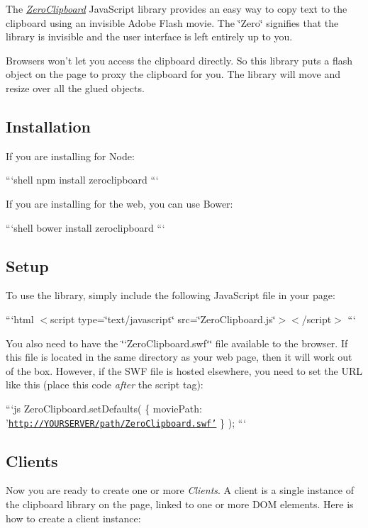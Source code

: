 The {\itshape \hyperlink{class_zero_clipboard}{Zero\-Clipboard}} Java\-Script library provides an easy way to copy text to the clipboard using an invisible Adobe Flash movie. The \char`\"{}\-Zero\char`\"{} signifies that the library is invisible and the user interface is left entirely up to you.

Browsers won't let you access the clipboard directly. So this library puts a flash object on the page to proxy the clipboard for you. The library will move and resize over all the glued objects.

\subsection*{Installation}

If you are installing for Node\-:

```shell npm install zeroclipboard ```

If you are installing for the web, you can use Bower\-:

```shell bower install zeroclipboard ```

\subsection*{Setup}

To use the library, simply include the following Java\-Script file in your page\-:

```html $<$script type=\char`\"{}text/javascript\char`\"{} src=\char`\"{}\-Zero\-Clipboard.\-js\char`\"{}$>$$<$/script$>$ ```

You also need to have the \char`\"{}`\-Zero\-Clipboard.\-swf`\char`\"{} file available to the browser. If this file is located in the same directory as your web page, then it will work out of the box. However, if the S\-W\-F file is hosted elsewhere, you need to set the U\-R\-L like this (place this code {\itshape after} the script tag)\-:

```js Zero\-Clipboard.\-set\-Defaults( \{ movie\-Path\-: '\href{http://YOURSERVER/path/ZeroClipboard.swf'}{\tt http\-://\-Y\-O\-U\-R\-S\-E\-R\-V\-E\-R/path/\-Zero\-Clipboard.\-swf'} \} ); ```

\subsection*{Clients}

Now you are ready to create one or more {\itshape Clients}. A client is a single instance of the clipboard library on the page, linked to one or more D\-O\-M elements. Here is how to create a client instance\-:

